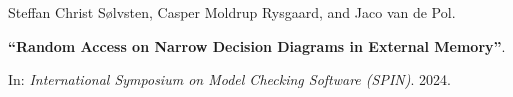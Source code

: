 Steffan Christ Sølvsten, Casper Moldrup Rysgaard, and Jaco van de Pol.

{\bf ``Random Access on Narrow Decision Diagrams in External Memory''}.

In: \emph{International Symposium on Model Checking Software (SPIN)}.
2024.

\medskip


\label{cite:2024.spin}
